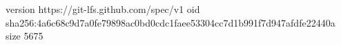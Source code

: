 version https://git-lfs.github.com/spec/v1
oid sha256:4a6c68c9d7a0fe79898ac0bd0cdc1faee53304cc7d1b991f7d947afdfe22440a
size 5675
